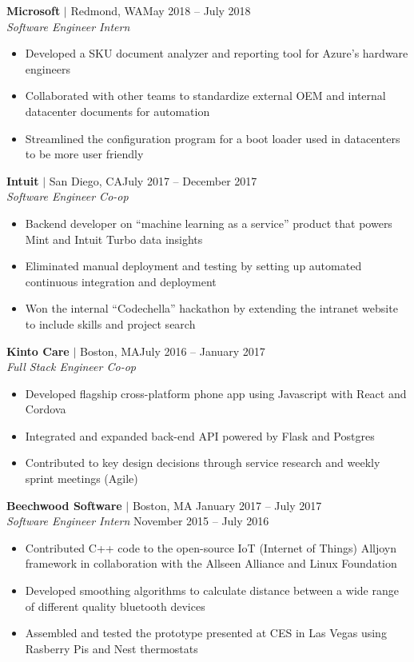 \documentclass[overlapped,line]{res}
\begin{document}
\begin{resume}
\textbf{Microsoft} $|$ Redmond, WA\hfill May 2018 \--- July 2018\\
{\sl Software Engineer Intern}
\begin{itemize} \itemsep -2pt
	\item Developed a SKU document analyzer and reporting tool for Azure's hardware engineers
	\item Collaborated with other teams to standardize external OEM and internal datacenter documents for automation
	\item Streamlined the configuration program for a boot loader used in datacenters to be more user friendly
\end{itemize}

\textbf{Intuit} $|$ San Diego, CA\hfill July 2017 \--- December 2017\\
{\sl Software Engineer Co-op}
\begin{itemize} \itemsep -2pt
	\item Backend developer on ``machine learning as a service'' product that powers Mint and Intuit Turbo data insights
	\item Eliminated manual deployment and testing by setting up automated continuous integration and deployment
	\item Won the internal ``Codechella'' hackathon by extending the intranet website to include skills and project search
\end{itemize}

\textbf{Kinto Care} $|$ Boston, MA\hfill July 2016 \--- January 2017\\
{\sl Full Stack Engineer Co-op}
\begin{itemize} \itemsep -2pt
	\item Developed flagship cross-platform phone app using Javascript with React and Cordova
	\item Integrated and expanded back-end API powered by Flask and Postgres
	\item Contributed to key design decisions through service research and weekly sprint meetings (Agile)
\end{itemize}

\textbf{Beechwood Software} $|$ Boston, MA \hfill January 2017 \--- July 2017\\
{\sl Software Engineer Intern} \hfill November 2015 \--- July 2016
\begin{itemize}  \itemsep -2pt
	\item Contributed C++ code to the open-source IoT (Internet of Things) Alljoyn framework in collaboration with the Allseen Alliance and Linux Foundation
	\item Developed smoothing algorithms to calculate distance between a wide range of different quality bluetooth devices
	\item Assembled and tested the prototype presented at CES in Las Vegas using Rasberry Pis and Nest thermostats
\end{itemize}
\noindent\makebox[7.15in]{\rule{7.15in}{0.4pt}}



\end{resume}
\end{document}
